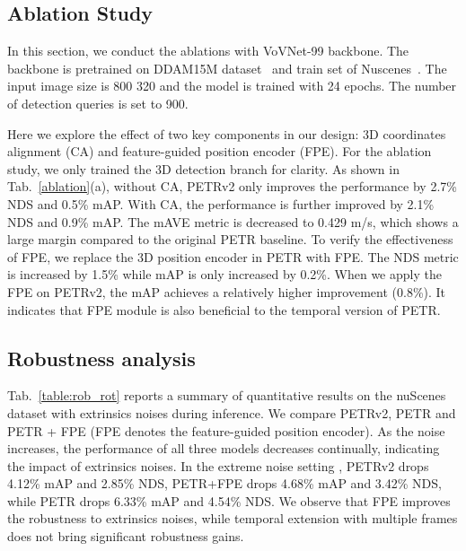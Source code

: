 \documentclass[10pt,twocolumn,letterpaper]{article}
\begin{document}
\subsection{Ablation Study}
In this section, we conduct the ablations with VoVNet-99 backbone. The backbone is pretrained on DDAM15M dataset~\cite{park2021dd3d} and train set of Nuscenes~\cite{caesar2020nuscenes}. The input image size is 800  320 and the model is trained with 24 epochs. The number of detection queries is set to 900.


Here we explore the effect of two key components in our design: 3D coordinates alignment (CA) and feature-guided position encoder (FPE). For the ablation study, we only trained the 3D detection branch for clarity. As shown in Tab.~\ref{ablation}(a), without CA, PETRv2 only improves the performance by 2.7\% NDS and 0.5\% mAP. With CA, the performance is further improved by 2.1\% NDS and 0.9\% mAP. The mAVE metric is decreased to 0.429 m/s, which shows a large margin compared to the original PETR baseline. To verify the effectiveness of FPE, we replace the 3D position encoder in PETR with FPE. The NDS metric is increased by 1.5\% while mAP is only increased by 0.2\%. When we apply the FPE on PETRv2, the mAP achieves a relatively higher improvement (0.8\%). It indicates that FPE module is also beneficial to the temporal version of PETR.









\subsection{Robustness analysis}
Tab.~\ref{table:rob_rot} reports a summary of quantitative results on the nuScenes dataset with extrinsics noises during inference. We compare PETRv2, PETR and PETR + FPE (FPE denotes the feature-guided position encoder).
As the noise increases, the performance of all three models decreases continually, indicating the impact of extrinsics noises. In the extreme noise setting , PETRv2 drops 4.12\% mAP and 2.85\% NDS, PETR+FPE drops 4.68\% mAP and 3.42\% NDS, while PETR drops 6.33\% mAP and 4.54\% NDS. We observe that FPE improves the robustness to extrinsics noises, while temporal extension with multiple frames does not bring significant robustness gains.
\end{document}
